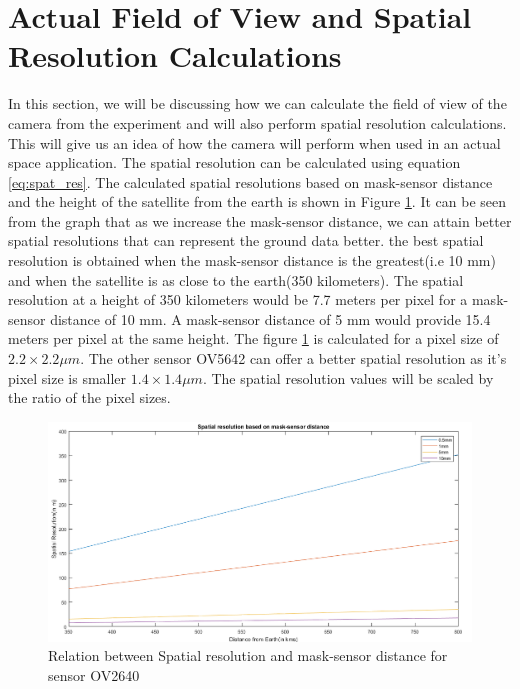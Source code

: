 \section{Actual Field of View and Spatial Resolution Calculations}
In this section, we will be discussing how we can calculate the field of view of the camera from the experiment and will also perform spatial resolution calculations. This will give us an idea of how the camera will perform when used in an actual space application. The spatial resolution can be calculated using equation \ref{eq:spat_res}. The calculated spatial resolutions based on mask-sensor distance and the height of the satellite from the earth is shown in Figure \ref{fig:spat-res-graph-1}. It can be seen from the graph that as we increase the mask-sensor distance, we can attain better spatial resolutions that can represent the ground data better. the best spatial resolution is obtained when the mask-sensor distance is the greatest(i.e 10 mm) and when the satellite is as close to the earth(350 kilometers). The spatial resolution at a height of 350 kilometers would be 7.7 meters per pixel for a mask-sensor distance of 10 mm. A mask-sensor distance of 5 mm would provide 15.4 meters per pixel at the same height. The figure \ref{fig:spat-res-graph-1} is calculated for a pixel size of $2.2 \times 2.2 \mu m$. The other sensor OV5642 can offer a better spatial resolution as it's pixel size is smaller $1.4 \times 1.4 \mu m$. The spatial resolution values will be scaled by the ratio of the pixel sizes. 

\begin{figure}[]
\centering
\includegraphics[width = \linewidth]{pics/spatial-res-calc}
\caption{Relation between Spatial resolution and mask-sensor distance for sensor OV2640}
\label{fig:spat-res-graph-1}
\end{figure}

